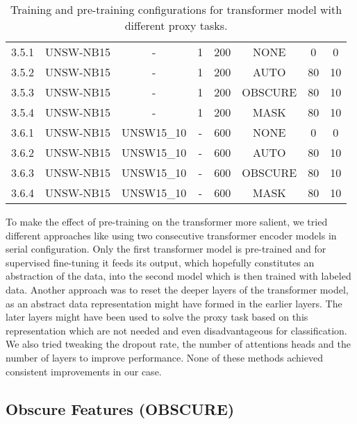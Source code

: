 \begin{table}[H]
{\begin{tabular}{cccccccc}
		3.5.1 & UNSW-NB15    & -          & 1           & 200           & NONE       & 0         & 0           \\
		3.5.2 & UNSW-NB15    & -          & 1           & 200           & AUTO       & 80        & 10          \\
		3.5.3 & UNSW-NB15    & -          & 1           & 200           & OBSCURE      & 80        & 10          \\
		3.5.4 & UNSW-NB15    & -          & 1           & 200           & MASK      & 80        & 10          \\
		3.6.1 & UNSW-NB15    & UNSW15\_10 & -           & 600           & NONE       & 0         & 0           \\
		3.6.2 & UNSW-NB15    & UNSW15\_10 & -           & 600           & AUTO       & 80        & 10          \\
		3.6.3 & UNSW-NB15    & UNSW15\_10 & -           & 600           & OBSCURE      & 80        & 10          \\
		3.6.4 & UNSW-NB15    & UNSW15\_10 & -           & 600           & MASK      & 80        & 10         
	\end{tabular}}
	\caption{Training and pre-training configurations for transformer model with different proxy tasks.}
	\label{table:experiments:transformer:configurations}
\end{table}

To make the effect of pre-training on the transformer more salient, we tried different approaches like using two consecutive transformer encoder models in serial configuration. Only the first transformer model is pre-trained and for supervised fine-tuning it feeds its output, which hopefully constitutes an abstraction of the data, into the second model which is then trained with labeled data.
Another approach was to reset the deeper layers of the transformer model, as an abstract data representation might have formed in the earlier layers. The later layers might have been used to solve the proxy task based on this representation which are not needed and even disadvantageous for classification. We also tried tweaking the dropout rate, the number of attentions heads and the number of layers to improve performance. None of these methods achieved consistent improvements in our case.


\subsection{Obscure Features (OBSCURE)} \label{sec:experiments:transformer:mask_feature}

